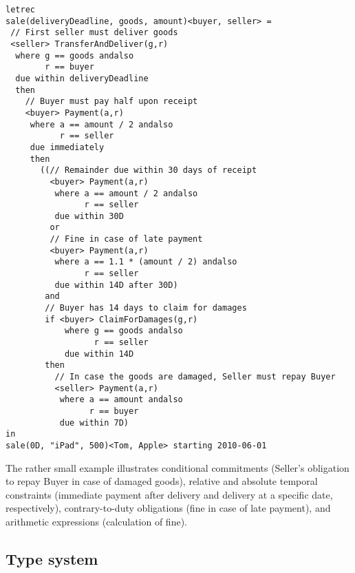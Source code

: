 \documentclass[orivec,final]{llncs-href}
\newcommand{\ccontract}[3]{\mathsf{letrec}\ #1\ \mathsf{in}\ #2\
  \mathsf{starting}\ #3}
\begin{document}
\begin{lstlisting}[language=csl]
letrec
sale(deliveryDeadline, goods, amount)<buyer, seller> =
 // First seller must deliver goods
 <seller> TransferAndDeliver(g,r)
  where g == goods andalso
        r == buyer
  due within deliveryDeadline
  then
    // Buyer must pay half upon receipt
    <buyer> Payment(a,r)
     where a == amount / 2 andalso
           r == seller
     due immediately
     then
       ((// Remainder due within 30 days of receipt
         <buyer> Payment(a,r)
          where a == amount / 2 andalso
                r == seller
          due within 30D
         or
         // Fine in case of late payment
         <buyer> Payment(a,r)
          where a == 1.1 * (amount / 2) andalso
                r == seller
          due within 14D after 30D)
        and
        // Buyer has 14 days to claim for damages
        if <buyer> ClaimForDamages(g,r)
            where g == goods andalso
                  r == seller
            due within 14D
        then
          // In case the goods are damaged, Seller must repay Buyer
          <seller> Payment(a,r)
           where a == amount andalso
                 r == buyer
           due within 7D)
in
sale(0D, "iPad", 500)<Tom, Apple> starting 2010-06-01
\end{lstlisting}
The rather small example illustrates conditional commitments (Seller's
obligation to repay Buyer in case of damaged goods), relative and
absolute temporal constraints (immediate payment after delivery and
delivery at a specific date, respectively), contrary-to-duty
obligations (fine in case of late payment), and arithmetic expressions
(calculation of fine).

\subsection{Type system}
\newcommand{\ctpduration}{\mathrm{Duration}}
\newcommand{\ctpbool}{\mathrm{Bool}}
\newcommand{\ctpnat}{\mathrm{Nat}}
\newcommand{\ctpint}{\mathrm{Int}}
\newcommand{\ctpagent}{\mathrm{Agent}}
\newcommand{\ctpdeadline}{\mathrm{Deadline}}
\newcommand{\ctpclause}[1]{\mathrm{Clause} \langle #1 \rangle}
\newcommand{\ctpatomic}[1]{\mathrm{Atomic} \langle #1 \rangle}
\newcommand{\ctpcontract}[1]{\mathrm{Contract} \langle #1 \rangle}
\newcommand{\ctaexp}[3]{#1 \vdash #2 : #3}
\newcommand{\ctdexp}[2]{#1 \vdash #2 : \ctpdeadline}
\newcommand{\ctexp}[3]{#1 \vdash #2 : #3}
\newcommand{\ctclause}[5]{#1,#2,#3 \vdash #4 : \ctpclause{#5}}
\newcommand{\ctcontext}[2]{\vdash #1 : #2}
\newcommand{\ctcontract}[2]{\vdash #1 : \ctpcontract{#2}}
\newcommand{\ctcontractrec}[4]{\ctcontract{\ccontract{#1}{#2}{#3}}{#4}}
\end{document}
